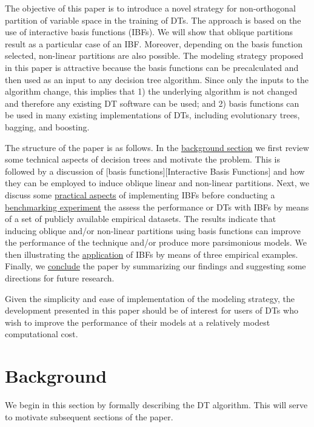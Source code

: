 \documentclass[]{elsarticle} %
\begin{document}
The objective of this paper is to introduce a novel strategy for
non-orthogonal partition of variable space in the training of DTs. The
approach is based on the use of interactive basis functions (IBFs). We
will show that oblique partitions result as a particular case of an IBF.
Moreover, depending on the basis function selected, non-linear
partitions are also possible. The modeling strategy proposed in this
paper is attractive because the basis functions can be precalculated and
then used as an input to any decision tree algorithm. Since only the
inputs to the algorithm change, this implies that 1) the underlying
algorithm is not changed and therefore any existing DT software can be
used; and 2) basis functions can be used in many existing
implementations of DTs, including evolutionary trees, bagging, and
boosting.

The structure of the paper is as follows. In the
\protect\hyperlink{background}{background section} we first review some
technical aspects of decision trees and motivate the problem. This is
followed by a discussion of {[}basis functions{]}{[}Interactive Basis
Functions{]} and how they can be employed to induce oblique linear and
non-linear partitions. Next, we discuss some
\protect\hyperlink{practical-considerations}{practical aspects} of
implementing IBFs before conducting a
\protect\hyperlink{benchmarking}{benchmarking experiment} the assess the
performance or DTs with IBFs by means of a set of publicly available
empirical datasets. The results indicate that inducing oblique and/or
non-linear partitions using basis functions can improve the performance
of the technique and/or produce more parsimonious models. We then
illustrating the \protect\hyperlink{sample-applications}{application} of
IBFs by means of three empirical examples. Finally, we
\protect\hyperlink{conclusions-and-directions-for-future-research}{conclude}
the paper by summarizing our findings and suggesting some directions for
future research.

Given the simplicity and ease of implementation of the modeling
strategy, the development presented in this paper should be of interest
for users of DTs who wish to improve the performance of their models at
a relatively modest computational cost.

\hypertarget{background}{\section{Background}\label{background}}

We begin in this section by formally describing the DT algorithm. This
will serve to motivate subsequent sections of the paper.
\end{document}

